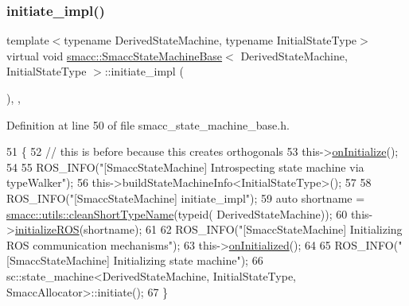 \subsubsection{\texorpdfstring{initiate\+\_\+impl()}{initiate\_impl()}}
{\footnotesize\ttfamily template$<$typename Derived\+State\+Machine, typename Initial\+State\+Type$>$ \\
virtual void \hyperlink{structsmacc_1_1SmaccStateMachineBase}{smacc\+::\+Smacc\+State\+Machine\+Base}$<$ Derived\+State\+Machine, Initial\+State\+Type $>$\+::initiate\+\_\+impl (\begin{DoxyParamCaption}{ }\end{DoxyParamCaption})\hspace{0.3cm}{\ttfamily [inline]}, {\ttfamily [override]}, {\ttfamily [virtual]}}



Definition at line 50 of file smacc\+\_\+state\+\_\+machine\+\_\+base.\+h.


\begin{DoxyCode}
51     \{
52         \textcolor{comment}{// this is before because this creates orthogonals}
53         this->\hyperlink{classsmacc_1_1ISmaccStateMachine_ac2982c6c8283663e5e1e8a7c82f511ec}{onInitialize}();
54 
55         ROS\_INFO(\textcolor{stringliteral}{"[SmaccStateMachine] Introspecting state machine via typeWalker"});
56         this->buildStateMachineInfo<InitialStateType>();
57 
58         ROS\_INFO(\textcolor{stringliteral}{"[SmaccStateMachine] initiate\_impl"});
59         \textcolor{keyword}{auto} shortname = \hyperlink{namespacesmacc_1_1utils_aacd1975bb7cd9bec4b50e111a2ae7edb}{smacc::utils::cleanShortTypeName}(\textcolor{keyword}{typeid}(
      DerivedStateMachine));
60         this->\hyperlink{classsmacc_1_1ISmaccStateMachine_a1136dd5d81e846ac86de48bc71912cbf}{initializeROS}(shortname);        
61 
62         ROS\_INFO(\textcolor{stringliteral}{"[SmaccStateMachine] Initializing ROS communication mechanisms"});
63         this->\hyperlink{classsmacc_1_1ISmaccStateMachine_a95e7f71d0d88fffd0afebb1f9ccdade5}{onInitialized}();
64 
65         ROS\_INFO(\textcolor{stringliteral}{"[SmaccStateMachine] Initializing state machine"});
66         sc::state\_machine<DerivedStateMachine, InitialStateType, SmaccAllocator>::initiate();
67     \}
\end{DoxyCode}
\mbox{\label{structsmacc_1_1SmaccStateMachineBase_af34aec9fa012f0e3858131c84abfd5ed}} 
